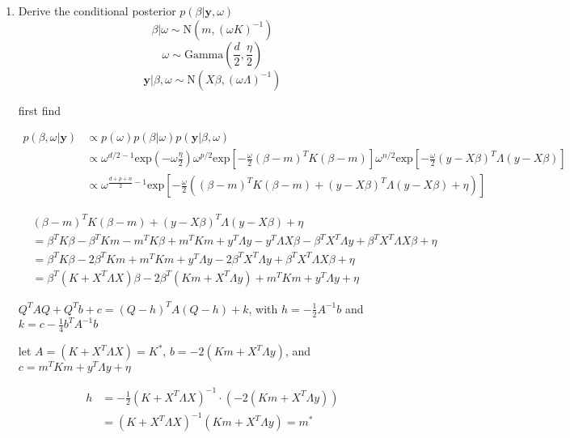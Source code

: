 \documentclass[10pt]{article}
\newcommand{\by}{\mathbf{y}}
\begin{document}
    \begin{enumerate}[label=(\Alph*)]
      \item Derive the conditional posterior $p(\beta| \by, \omega)$
      $$\beta | \omega \sim \text{N}(m, (\omega K)^{-1})$$
      $$\omega \sim \text{Gamma}\left(\frac{d}{2}, \frac{\eta}{2} \right)$$
      $$\by | \beta, \omega \sim \text{N}(X\beta, (\omega \Lambda)^{-1})$$

      first find

      \begin{align*}
        p(\beta, \omega | \by) &\propto p(\omega) p(\beta| \omega) p(\by | \beta, \omega) \\
        &\propto \omega^{d/2 -1} \text{exp}\left( - \omega \frac{\eta}{2}\right) \omega^{p/2} \text{exp}\left[ -\frac{\omega}{2} (\beta - m)^T K (\beta - m) \right] \omega^{n/2} \text{exp}\left[ -\frac{\omega}{2} (y - X\beta)^T \Lambda (y - X\beta) \right] \\
        &\propto \omega^{\frac{d+p+n}{2}-1} \text{exp}\left[-\frac{\omega}{2} \left ( (\beta - m)^T K (\beta - m) + (y - X\beta)^T \Lambda (y - X\beta) + \eta \right) \right]
      \end{align*}

      \begin{align*}
        & (\beta - m)^T K (\beta - m) + (y - X\beta)^T \Lambda (y - X\beta) + \eta \\
        &= \beta^T K \beta - \beta^T K m - m^T K \beta + m^T K m + y^T \Lambda y - y^T \Lambda X \beta - \beta^T X^T \Lambda y + \beta^T X^T \Lambda X \beta + \eta \\
        &= \beta^T K \beta - 2 \beta^T K m + m^T K m + y^T \Lambda y - 2 \beta^T X^T \Lambda y + \beta^T X^T \Lambda X \beta + \eta \\
        &= \beta^T ( K+ X^T \Lambda X) \beta - 2 \beta^T (K m + X^T \Lambda y) + m^TKm + y^T\Lambda y + \eta
      \end{align*}

      $Q^T A Q + Q^T b + c = (Q - h)^T A (Q - h) + k$, with $h = -\frac{1}{2}A^{-1} b$ and $k = c - \frac{1}{4} b^T A^{-1} b$

      let $A = ( K+ X^T \Lambda X) = K^*$, $b = - 2 (K m + X^T \Lambda y)$, and $c = m^T K m + y^T  \Lambda y + \eta$

      \begin{align*}
        h &= -\frac{1}{2} (K + X^T \Lambda X)^{-1} \cdot (- 2 (K m + X^T \Lambda y)) \\
        &= (K + X^T \Lambda X)^{-1}(K m + X^T \Lambda y) = m^*
      \end{align*}


\end{enumerate}
\end{document}
